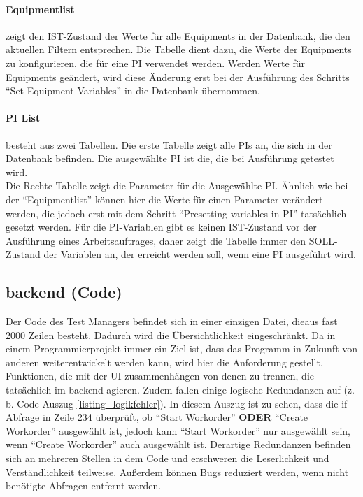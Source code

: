 \paragraph{Equipmentlist} zeigt den IST-Zustand der Werte für alle Equipments in der Datenbank, die den aktuellen Filtern entsprechen. Die Tabelle dient dazu, die Werte der Equipments zu konfigurieren, die für eine \gls{PI} verwendet werden. Werden Werte für Equipments geändert, wird diese Änderung erst bei der Ausführung des Schritts \enquote{Set Equipment Variables} in die Datenbank übernommen.

\paragraph{PI List} besteht aus zwei Tabellen. Die erste Tabelle zeigt alle \glspl{PI} an, die sich in der Datenbank befinden. Die ausgewählte \gls{PI} ist die, die bei Ausführung getestet wird.\\
Die Rechte Tabelle zeigt die Parameter für die Ausgewählte \gls{PI}. Ähnlich wie bei der \enquote{Equipmentlist} können hier die Werte für einen Parameter verändert werden, die jedoch erst mit dem Schritt \enquote{Presetting variables in PI} tatsächlich gesetzt werden. Für die \gls{PI}-Variablen gibt es keinen IST-Zustand vor der Ausführung eines Arbeitsauftrages, daher zeigt die Tabelle immer den SOLL-Zustand der Variablen an, der erreicht werden soll, wenn eine \gls{PI} ausgeführt wird.

\glsdisablehyper %
\subsection{\texorpdfstring{\gls{backend}}{Backend} (Code)}\label{subsec_backend}
\glsenablehyper
Der Code des Test Managers befindet sich in einer einzigen Datei, dieaus fast 2000 Zeilen besteht. Dadurch wird die Übersichtlichkeit eingeschränkt. Da in einem Programmierprojekt immer ein Ziel ist, dass das Programm in Zukunft von anderen weiterentwickelt werden kann, wird hier die Anforderung gestellt, Funktionen, die mit der \gls{UI} zusammenhängen von denen zu trennen, die tatsächlich im \gls{backend} agieren. Zudem fallen einige logische Redundanzen auf (z. b. Code-Auszug \ref{listing_logikfehler}). In diesem Auszug ist zu sehen, dass die if-Abfrage in Zeile 234 überprüft, ob \enquote{Start Workorder} \textbf{ODER} \enquote{Create Workorder} ausgewählt ist, jedoch kann \enquote{Start Workorder} nur ausgewählt sein, wenn \enquote{Create Workorder} auch ausgewählt ist. Derartige Redundanzen befinden sich an mehreren Stellen in dem Code und erschweren die Leserlichkeit und Verständlichkeit teilweise. Außerdem können Bugs reduziert werden, wenn nicht benötigte Abfragen entfernt werden.


